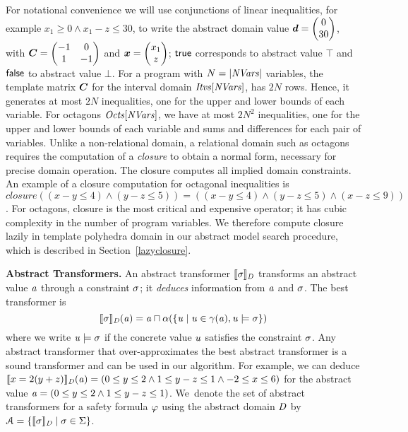 For notational convenience we will use conjunctions of linear
inequalities, for example $x_1\geq 0 \wedge x_1-z\leq 30$, to write the
abstract domain value $\vec{\numabsval}=\vecv{0}{30}$,
with $\mat{C}=\qmat{-1}{0}{1}{-1}$ and $\vec{\numvar}=\vecv{x_1}{z}$; 
$\mathsf{true}$ corresponds to abstract value $\top$ and $\mathsf{false}$ to 
abstract value $\bot$.
%
For a program with $N=|\mathit{NVars}|$ variables, the template 
matrix ${\boldsymbol C}$ for the interval domain $\mathit{Itvs}[\mathit{NVars}]$, 
has $2N$ rows. Hence, it generates at most $2N$ inequalities, one
for the upper and lower bounds of each variable.
%
For octagons $\mathit{Octs}[\mathit{NVars}]$, we have at most $2N^2$
inequalities, one for the upper and lower bounds of each variable and
sums and differences for each pair of variables. 
Unlike a non-relational domain, a relational domain such as octagons 
requires the computation of a \emph{closure} to obtain a normal 
form, necessary for precise domain operation. 
The closure computes all implied domain constraints.  
An example of a closure computation for octagonal inequalities is
$\mathit{closure}((x-y \leq 4) \wedge (y-z \leq 5))=((x-y \leq 4) \wedge (y-z
\leq 5) \wedge (x-z \leq 9))$.
%
For octagons, closure is the most critical and expensive operator; it has  
cubic complexity in the number of program variables.  We therefore compute 
closure lazily in template polyhedra domain in our abstract model search 
procedure, which is described in Section~\ref{lazyclosure}. 

\bigskip

\noindent\textbf{Abstract Transformers.}
An abstract transformer $\llbracket \sigma \rrbracket_{\mathit{D}}$ transforms an
abstract value $\mathit{a}$ through a constraint $\sigma$; it
\emph{deduces} information from $\mathit{a}$ and $\sigma$.  The best
transformer is
%
\begin{equation}\label{eq:abstrans}
\llbracket \sigma \rrbracket_{\mathit{D}}(\mathit{a})=\mathit{a}\sqcap\alpha(\{\mathit{u}\mid \mathit{u}\in\gamma(\mathit{a}), \mathit{u}\models \sigma\})
\end{equation}
 where we write 
$\mathit{u}\models \sigma$ if the concrete value $\mathit{u}$ satisfies the constraint $\sigma$.
%
Any abstract transformer that over-approximates the best abstract
transformer is a sound transformer and can be used in our algorithm.
%
For example, we can deduce $\llbracket x=2(y+z) \rrbracket_{\mathit{D}}(\mathit{a})=(0\leq y
\leq 2 \wedge\allowbreak 1 \leq y-z \leq 1\wedge\allowbreak -2\leq x\leq 6)$
for the abstract value $\mathit{a}=(0\leq y \leq 2 \wedge\allowbreak 1 \leq y-z
\leq 1)$.
%
We~denote the set of abstract transformers for a safety formula
$\varphi$ using the abstract domain $\mathit{D}$ by
$\mathcal{A}=\{\llbracket \sigma \rrbracket_{\mathit{D}}\mid
\sigma\in\Sigma\}$.
%


